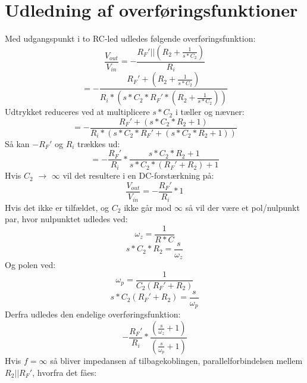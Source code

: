 \chapter{Udledning af overføringsfunktioner}
\label{app:Overfoeringsfunktion}
%
Med udgangspunkt i to RC-led udledes følgende overføringsfunktion:
%
\begin{equation}
        \frac{V_{out}}{V_{in}} = -\frac{R_F'||\left(R_2+\frac{1}{s*C_2}\right)}{R_i}
\end{equation}
%
\begin{equation}
        = - \frac{R_F'+\left(R_2+\frac{1}{s*C_2}\right)}{R_i*\left(s*C_2*R_F'*\left(R_2+\frac{1}{s*C_2}\right)\right)}
\end{equation}
%
Udtrykket reduceres ved at multiplicere $s*C_2$ i tæller og nævner:
%
\begin{equation}
        = - \frac{R_F'+\left(s*C_2*R_2+1\right)}{R_i*\left(s*C_2*R_F'+\left(s*C_2*R_2+1\right)\right)}
\end{equation}
%
Så kan $-R_F'$ og $R_i$ trækkes ud:
%
\begin{equation}
        = -\frac{R_F'}{R_i}*\frac{s*C_2*R_2+1}{s*C_2*\left(R_F'+R_2\right)+1}
\end{equation}
% 
Hvis $C_2$ $\longrightarrow$ $\infty$ vil det resultere i en DC-forstærkning på:
%
\begin{equation}
        \frac{V_{out}}{V_{in}} = -\frac{R_F'}{R_i}*1
\end{equation}
%
Hvis det ikke er tilfældet, og $C_2$ ikke går mod $\infty$ så vil der være et pol/nulpunkt par, hvor nulpunktet udledes ved:
%
\begin{equation}
        \omega_z = \frac{1}{R*C} 
\end{equation}
%
\begin{equation}
         s*C_2*R_2 = \frac{s}{\omega_z}
\end{equation}
%
Og polen ved:
%
\begin{equation}
        \omega_p = \frac{1}{C_2\left(R_F'+R_2\right)}
\end{equation}
%
\begin{equation}
        s*C_2\left(R_F'+R_2\right) = \frac{s}{\omega_p}
\end{equation}
%
Derfra udledes den endelige overføringsfunktion:
%
\begin{equation}
        -\frac{R_F'}{R_i}*\frac{\left(\frac{s}{\omega_z}+1\right)}{\left(\frac{s}{\omega_p}+1\right)}
\end{equation}
%
Hvis $f = \infty$ så bliver impedansen af tilbagekoblingen, parallelforbindelsen mellem $R_2||R_F'$, hvorfra det fåes:
